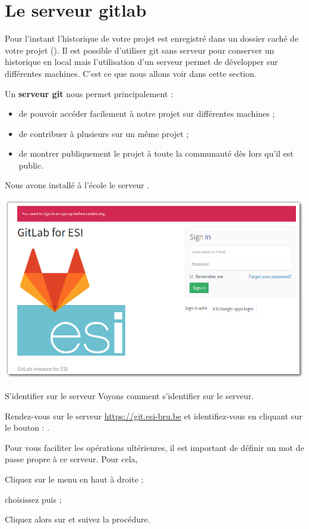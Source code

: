 \documentclass[a4paper,11pt]{style-esi/td}
\begin{document}
\section{Le serveur gitlab}

Pour l'instant l'historique de votre projet 
est enregistré dans un dossier caché de votre projet ().
Il est possible d'utiliser git sans serveur pour conserver un historique en local
mais l'utilisation d'un serveur permet de développer sur différentes machines.
C'est ce que nous allons voir dans cette section.

Un \textbf{serveur git} nous permet principalement :
\begin{itemize}
	\item de pouvoir accéder facilement à notre projet sur différentes machines ;
	\item de contribuer à plusieurs sur un même projet ;
	\item de montrer publiquement le projet à toute la communauté dès lors qu'il est public.
\end{itemize}

Nous avons installé à l'école le serveur .
\begin{center}
	\includegraphics[width=.5\textwidth]{image/gitlab.png}
\end{center}

\begin{Tutoriel}{S'identifier sur le serveur}
	Voyons comment s'identifier sur le serveur.
	\begin{steps}
	\item 
		Rendez-vous sur le serveur
		\url{https://git.esi-bru.be}
		et identifiez-vous en cliquant sur le bouton :
		.
	\end{steps}
	Pour vous faciliter les opérations ultérieures,
	il est important de définir un mot de passe propre à ce serveur.
	Pour cela,
	\begin{steps}
	\item Cliquez sur le menu en haut à droite ;
	\item choisissez \samp{Profile settings}
			puis \samp{Password} ;
	\item Cliquez alors sur  et suivez la procédure.
	\end{steps}
\end{Tutoriel}
\end{document}
